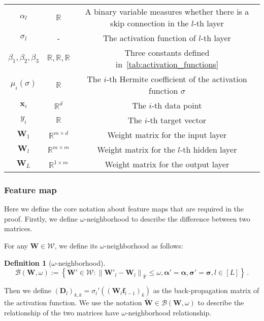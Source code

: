 \documentclass[nohyperref]{article}
\theoremstyle{plain}
\theoremstyle{definition}
\newtheorem{definition}{Definition}
\theoremstyle{remark}
\begin{document}
\begin{table}[ht]
\begin{tabular}{c | c | c}
$\alpha_l$ & $\mathbb{R}$ & A binary variable measures whether there is a skip connection in the $l$-th layer \\
$\sigma_l$ & - & The activation function of $l$-th layer \\
$\beta_1, \beta_2, \beta_3$ & $\mathbb{R}, \mathbb{R}, \mathbb{R}$ & Three constants defined in~\cref{tab:activation_functions} \\
$\mu_i(\sigma)$ & $\mathbb{R}$ & The $i$-th Hermite coefficient of the activation function $\sigma$\\
\midrule
$\bm{x}_i$ & $\mathbb{R}^{d}$ & The $i$-th data point \\
$y_i$ & $\mathbb{R}$ & The $i$-th target vector \\
$\bm{W}_1$ & $\mathbb{R}^{m \times d}$ & Weight matrix for the input layer \\
$\bm{W}_l$ & $\mathbb{R}^{m \times m}$ & Weight matrix for the $l$-th hidden layer \\
$\bm{W}_L$ & $\mathbb{R}^{1 \times m}$ & Weight matrix for
the output layer \\
\midrule
\end{tabular}
\end{table}


\subsubsection{Feature map}
\label{sssec:problem_setting_feature_map}

Here we define the core notation about feature maps that are required in the proof. Firstly, we define $\omega $-neighborhood to describe the difference between two matrices.
 

For any $\bm{W} \in \mathcal{W} $, we define its $\omega $-neighborhood as follows:

\begin{definition}[$\omega $-neighborhood]
\label{def:omega_neighborhood}
\begin{equation*}
\mathcal{B} (\bm{W},\omega ) :=\left \{ \bm{W}'\in \mathcal{W}: \left \| \bm{W}'_l - \bm{W}_l \right \|_{\mathrm{F}} \leq \omega ,\bm{\alpha}'=\bm{\alpha},\bm{\sigma}'=\bm{\sigma}, l \in [L]   \right \}\,.
\end{equation*}
\end{definition}

Then we define $(\bm{D}_{l})_{k,k} = {\sigma_l}'((\bm{W}_l \bm{f}_{l-1})_k)$ as the back-propagation matrix of the activation function. We use the notation $\widetilde{\bm{W}} \in \mathcal{B} (\bm{W},\omega )$ to describe the relationship of the two matrices have $\omega $-neighborhood relationship.
\end{document}
